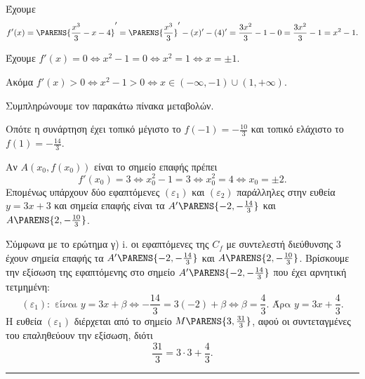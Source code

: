 \begin{alist}
\item Έχουμε
\[ f'(x) = \PARENS{\frac{x^3}{3}-x-4}' = \PARENS{\frac{x^3}{3}}' - (x)' - (4)' = \frac{3x^2}{3}-1-0 = \frac{3x^2}{3}-1 = x^2-1. \]

\item Έχουμε $f'(x)=0 \Leftrightarrow x^2-1=0 \Leftrightarrow x^2=1 \Leftrightarrow x=\pm 1$.

Ακόμα $f'(x)>0 \Leftrightarrow x^2-1>0 \Leftrightarrow x \in (-\infty,-1)\cup(1,+\infty)$.

Συμπληρώνουμε τον παρακάτω πίνακα μεταβολών.

\begin{center}
\end{center}

Οπότε η συνάρτηση έχει τοπικό μέγιστο το $f(-1) = -\frac{10}{3}$ και τοπικό ελάχιστο το $f(1) = -\frac{14}{3}$.
\item 
\begin{rlist}
\item Αν $A(x_0,f(x_0))$ είναι το σημείο επαφής πρέπει
\[ f'(x_0) = 3 \Leftrightarrow x_0^2-1=3 \Leftrightarrow x_0^2=4 \Leftrightarrow x_0 = \pm 2. \]
Επομένως υπάρχουν δύο εφαπτόμενες $(\varepsilon_1)$ και $(\varepsilon_2)$ παράλληλες στην ευθεία $y=3x+3$ και σημεία επαφής είναι τα $A'\PARENS{-2, -\frac{14}{3}}$ και $A\PARENS{2, -\frac{10}{3}}$.

\item Σύμφωνα με το ερώτημα γ) i. οι εφαπτόμενες της $C_f$ με συντελεστή διεύθυνσης 3 έχουν σημεία επαφής τα $A'\PARENS{-2, -\frac{14}{3}}$ και $A\PARENS{2, -\frac{10}{3}}$. Βρίσκουμε την εξίσωση της εφαπτόμενης στο σημείο $A'\PARENS{-2, -\frac{14}{3}}$ που έχει αρνητική τετμημένη:
\[ (\varepsilon_1): \text{ είναι } y=3x+\beta \Leftrightarrow -\frac{14}{3} = 3(-2) + \beta \Leftrightarrow \beta = \frac{4}{3}. \text{ Άρα } y=3x+\frac{4}{3}. \]
Η ευθεία $(\varepsilon_1)$ διέρχεται από το σημείο $M\PARENS{3, \frac{31}{3}}$, αφού οι συντεταγμένες του επαληθεύουν την εξίσωση, διότι
\[ \frac{31}{3} = 3 \cdot 3 + \frac{4}{3}. \]
\end{rlist}
\end{alist}
\vspace{6mm}
\noindent\rule{\textwidth}{0.4pt}
\vspace{6mm}

